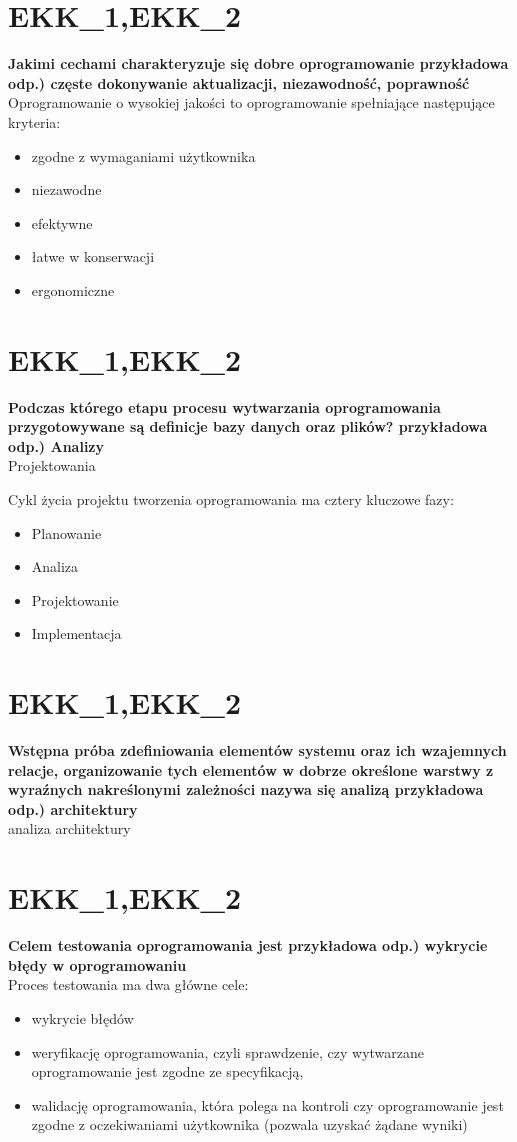 \section{EKK\_1,EKK\_2}
\textbf{Jakimi cechami charakteryzuje się dobre oprogramowanie przykładowa odp.) częste dokonywanie aktualizacji, niezawodność, poprawność
} 
\\
Oprogramowanie o wysokiej jakości to oprogramowanie spełniające następujące kryteria:
\begin{itemize}
\item zgodne z wymaganiami użytkownika
\item niezawodne
\item efektywne
\item łatwe w konserwacji
\item ergonomiczne
\end{itemize}

\section{EKK\_1,EKK\_2}
\textbf{Podczas którego etapu procesu wytwarzania oprogramowania przygotowywane są definicje bazy danych oraz plików? 
przykładowa odp.) Analizy
}
\\
Projektowania

Cykl życia projektu tworzenia oprogramowania ma cztery kluczowe fazy:
\begin{itemize}
\item Planowanie
\item Analiza
\item Projektowanie
\item Implementacja
\end{itemize}
\section{EKK\_1,EKK\_2}
\textbf{Wstępna próba zdefiniowania elementów systemu oraz ich wzajemnych relacje, organizowanie tych elementów w dobrze określone warstwy z wyraźnych nakreślonymi zależności nazywa się analizą przykładowa odp.) architektury}
\\
analiza architektury
\section{EKK\_1,EKK\_2}
\textbf{Celem testowania oprogramowania jest przykładowa odp.) wykrycie błędy w oprogramowaniu}
\\
Proces testowania ma dwa główne cele:
\begin{itemize}
\item wykrycie błędów
\item weryfikację oprogramowania, czyli sprawdzenie, czy wytwarzane oprogramowanie jest zgodne ze specyfikacją,
\item walidację oprogramowania, która polega na kontroli czy oprogramowanie jest zgodne z oczekiwaniami użytkownika (pozwala uzyskać żądane wyniki)
\end{itemize}

